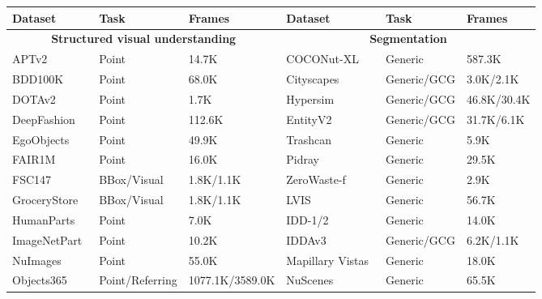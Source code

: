 \begin{table}[htb]
  \centering
  \small
  \renewcommand{\arraystretch}{0.88}
  \setlength{\tabcolsep}{3pt}
  \begin{tabular}{p{}|p{}|p{}||p{}|p{}|p{}}
    \toprule
    Dataset & Task & Frames & Dataset & Task & Frames \\
    \midrule
    \multicolumn{3}{c||}{\textbf{Structured visual understanding}} & \multicolumn{3}{c}{\textbf{Segmentation}} \\
    \cmidrule(r){1-3}\cmidrule(l){4-6}
    APTv2~\cite{yang2023aptv2benchmarkinganimalpose} & Point & 14.7K & COCONut-XL~\cite{coconut2024cvpr} & Generic & 587.3K \\
    BDD100K~\cite{yu2020bdd100k} & Point & 68.0K & Cityscapes~\cite{Cordts2016Cityscapes, Cordts2015Cvprw} & Generic/GCG & 3.0K/2.1K \\
    DOTAv2~\cite{Ding_2022} & Point & 1.7K & Hypersim~\cite{roberts:2021} & Generic/GCG & 46.8K/30.4K \\
    DeepFashion~\cite{liuLQWTcvpr16DeepFashion} & Point & 112.6K & EntityV2~\cite{Qi_2023_EntitySeg} & Generic/GCG & 31.7K/6.1K \\
    EgoObjects~\cite{zhu2023egoobjects} & Point & 49.9K & Trashcan~\cite{hong2020trashcansemanticallysegmenteddatasetvisual} & Generic & 5.9K \\
    FAIR1M~\cite{SUN2022116} & Point & 16.0K & Pidray~\cite{zhang2022pidraylargescalexraybenchmark} & Generic & 29.5K \\
    FSC147~\cite{amininaieni2023openworldtextspecifiedobjectcounting} & BBox/Visual & 1.8K/1.1K & ZeroWaste-f~\cite{Bashkirova_2022_CVPR} & Generic & 2.9K \\
    GroceryStore~\cite{klasson2019hierarchical} & BBox/Visual & 1.8K/1.1K & LVIS~\cite{gupta2019lvis} & Generic & 56.7K \\
    HumanParts~\cite{li2019detector} & Point & 7.0K & IDD-1/2~\cite{varma2019idd} & Generic & 14.0K \\
    ImageNetPart~\cite{he2022partimagenet} & Point & 10.2K & IDDAv3~\cite{alberti2020idda} & Generic/GCG & 6.2K/1.1K \\
    NuImages~\cite{Fong2025nuScenesRP} & Point & 55.0K & Mapillary Vistas~\cite{garg2025mapillaryvistasvalidationfinegrained} & Generic & 18.0K \\
    Objects365~\cite{shao2019objects365} & Point/Referring & 1077.1K/3589.0K & NuScenes~\cite{fong2021panoptic} & Generic & 65.5K \\

\end{tabular}
\end{table}
